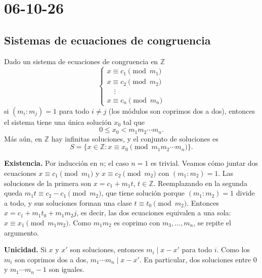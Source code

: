\chapter{06-10-26}

\section{Sistemas de ecuaciones de congruencia}

\begin{proposicion}[{title={Teorema chino del resto}}]
Dado un sistema de ecuaciones de congruencia en $\mathbb{Z}$
\[
\begin{cases}
x\equiv c_1 \pmod{m_1}\\
x\equiv c_2 \pmod{m_2}\\
\quad\vdots\\
x\equiv c_n \pmod{m_n}
\end{cases}
\]
si $(m_i:m_j)=1$ para todo $i\neq j$ (los módulos son coprimos dos a dos),
entonces el sistema tiene una única solución $x_0$ tal que
\[
0\le x_0<m_1m_2\cdots m_n.
\]
Más aún, en $\mathbb{Z}$ hay infinitas soluciones, y el conjunto de soluciones es
\[
S=\{x\in\mathbb{Z} : x\equiv x_0 \pmod{m_1m_2\cdots m_n}\}.
\]
\end{proposicion}

\begin{demostracion}
\textbf{Existencia.} Por inducción en $n$; el caso $n=1$ es trivial. Veamos cómo
juntar dos ecuaciones $x\equiv c_1 \pmod{m_1}$ y $x\equiv c_2 \pmod{m_2}$ con
$(m_1:m_2)=1$. Las soluciones de la primera son $x=c_1+m_1t$, $t\in\mathbb{Z}$.
Reemplazando en la segunda queda $m_1t\equiv c_2-c_1 \pmod{m_2}$, que tiene
solución porque $(m_1:m_2)=1$ divide a todo, y sus soluciones forman una clase
$t\equiv t_0 \pmod{m_2}$. Entonces $x=c_1+m_1t_0+m_1m_2 j$, es decir, las dos
ecuaciones equivalen a una sola: $x\equiv x_1 \pmod{m_1m_2}$. Como $m_1m_2$ es
coprimo con $m_3,\dots,m_n$, se repite el argumento.

\textbf{Unicidad.} Si $x$ y $x'$ son soluciones, entonces $m_i\mid x-x'$ para
todo $i$. Como los $m_i$ son coprimos dos a dos, $m_1\cdots m_n\mid x-x'$. En
particular, dos soluciones entre $0$ y $m_1\cdots m_n-1$ son iguales.
\end{demostracion}

